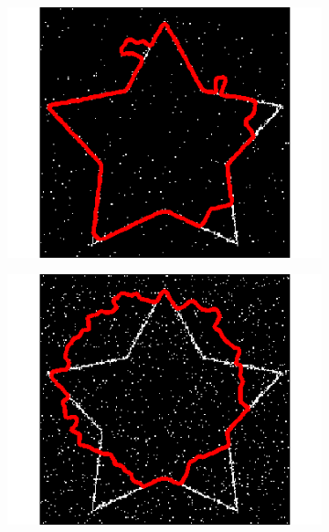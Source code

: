\begin{appendices}
\begin{figure}[H]
\centering
\begin{subfigure}[c]{0.3\linewidth}
\centering
\includegraphics[width=\textwidth]{Chapters/Images/Noise/gvfimp1}
\caption{}
\end{subfigure}
\begin{subfigure}[c]{0.3\linewidth}
\centering
\includegraphics[width=\textwidth]{Chapters/Images/Noise/gvfimp5}
\caption{}
\end{subfigure}
\begin{subfigure}[c]{0.3\linewidth}
\centering

\end{subfigure}
\end{figure}
\end{appendices}
